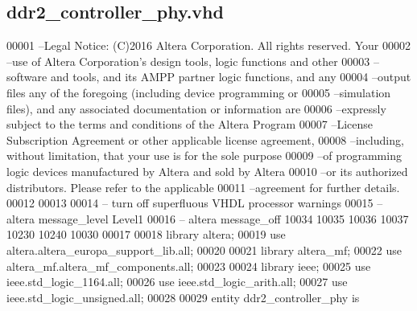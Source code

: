 \subsection{ddr2\+\_\+controller\+\_\+phy.\+vhd}
\label{ddr2__controller__phy_8vhd_source}

\begin{DoxyCode}
00001 \textcolor{keyword}{--Legal Notice: (C)2016 Altera Corporation. All rights reserved.  Your}
00002 \textcolor{keyword}{--use of Altera Corporation's design tools, logic functions and other}
00003 \textcolor{keyword}{--software and tools, and its AMPP partner logic functions, and any}
00004 \textcolor{keyword}{--output files any of the foregoing (including device programming or}
00005 \textcolor{keyword}{--simulation files), and any associated documentation or information are}
00006 \textcolor{keyword}{--expressly subject to the terms and conditions of the Altera Program}
00007 \textcolor{keyword}{--License Subscription Agreement or other applicable license agreement,}
00008 \textcolor{keyword}{--including, without limitation, that your use is for the sole purpose}
00009 \textcolor{keyword}{--of programming logic devices manufactured by Altera and sold by Altera}
00010 \textcolor{keyword}{--or its authorized distributors.  Please refer to the applicable}
00011 \textcolor{keyword}{--agreement for further details.}
00012 
00013 
00014 \textcolor{keyword}{-- turn off superfluous VHDL processor warnings }
00015 \textcolor{keyword}{-- altera message\_level Level1 }
00016 \textcolor{keyword}{-- altera message\_off 10034 10035 10036 10037 10230 10240 10030 }
00017 
00018 \textcolor{vhdlkeyword}{library }\textcolor{keywordflow}{altera};
00019 \textcolor{vhdlkeyword}{use }altera.altera\_europa\_support\_lib.\textcolor{keywordflow}{all};
00020 
00021 \textcolor{vhdlkeyword}{library }\textcolor{keywordflow}{altera\_mf};
00022 \textcolor{vhdlkeyword}{use }altera\_mf.altera\_mf\_components.\textcolor{keywordflow}{all};
00023 
00024 \textcolor{vhdlkeyword}{library }\textcolor{keywordflow}{ieee};
00025 \textcolor{vhdlkeyword}{use }ieee.std\_logic\_1164.\textcolor{keywordflow}{all};
00026 \textcolor{vhdlkeyword}{use }ieee.std\_logic\_arith.\textcolor{keywordflow}{all};
00027 \textcolor{vhdlkeyword}{use }ieee.std\_logic\_unsigned.\textcolor{keywordflow}{all};
00028 
00029 \textcolor{keywordflow}{entity }ddr2_controller_phy \textcolor{keywordflow}{is} 

\end{DoxyCode}
